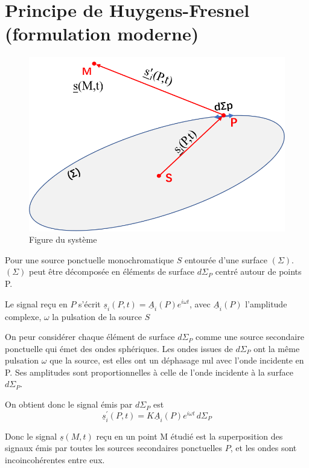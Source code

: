 \documentclass[a4paper,12pt]{book}
\begin{document}
\renewcommand{\labelitemi}{$\blacktriangleright$}
\renewcommand{\labelitemii}{$\bullet$}


\section{Principe de Huygens-Fresnel (formulation moderne)}
\begin{figure}[h]
    \begin{center}
    \includegraphics[scale=0.7]{tr151.png}
    \end{center}
    \caption{Figure du système}
\end{figure}
Pour une source ponctuelle monochromatique $S$ entourée d'une surface $(\Sigma)$. 
$(\Sigma)$ peut être décomposée en éléments de surface $d\Sigma_P$ centré autour de
points P. 

Le signal reçu en $P$ s'écrit $\underline{s}_i(P,t) = \underline{A}_i(P)e^{i\omega t}$, 
avec $\underline{A}_i(P)$ l'amplitude complexe, $\omega$ la pulsation de la source $S$

On peur considérer chaque élément de surface $d\Sigma_P$ comme une source secondaire ponctuelle qui émet
des ondes sphériques. Les ondes issues de $d\Sigma_P$ ont la même pulsation $\omega$ que la source, 
est elles ont un déphasage nul avec l'onde incidente en P.
Ses amplitudes sont proportionnelles à celle de l'onde incidente à la surface $d\Sigma_P$.

On obtient donc le signal émis par $d\Sigma_P$ est
$$
\underline{s}_i^{'}(P,t)=K\underline{A}_i(P)e^{i\omega t}\,d\Sigma_P
$$

Donc le signal $\underline{s}(M, t)$ reçu en un point M étudié est la superposition des signaux émis
par toutes les sources secondaires ponctuelles $P$, et les ondes sont incoincohérentes entre eux. 
\end{document}
